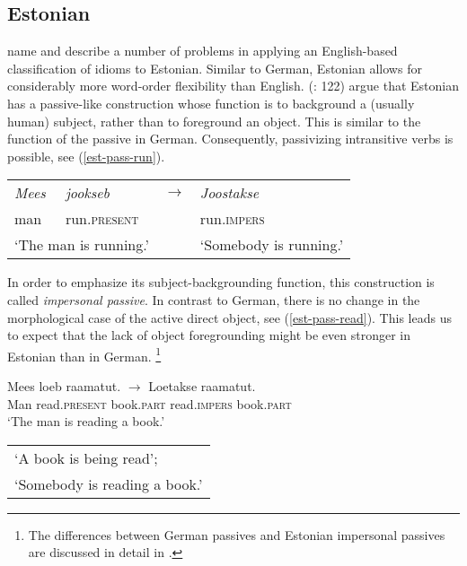 \documentclass[output=paper]{langsci/langscibook}
\begin{document}
\subsection{Estonian}

\cite{Muischnek:Kaalep:10} name and describe a number of problems in applying an English-based classification of idioms to Estonian. Similar to German, Estonian allows for considerably more word-order flexibility than English. 
\citeauthor{Muischnek:Kaalep:10} (\citeyear{Muischnek:Kaalep:10}: 122) argue that Estonian has a  passive-like construction whose function is to background a (usually human) subject, rather than to foreground an object. This is similar to the function of the passive in German. 
Consequently, passivizing intransitive verbs is possible, see (\ref{est-pass-run}).

\begin{exe}
\ex \begin{tabular}[t]{llcl}
\textit{Mees} & \textit{jookseb} & $\longrightarrow$\qquad\qquad &\textit{Joostakse}\\
man& run.\textsc{present} 	&{}&	run.\textsc{impers}\\
\multicolumn{2}{l}{`The man is running.'} & 	{}	&`Somebody is running.'
\end{tabular}
\label{est-pass-run}
\end{exe}


In order to emphasize its subject-backgrounding function, this construction is called \emph{impersonal passive}. In contrast to German, there is no change in the morpho\-logical case of the active direct object, see (\ref{est-pass-read}). This leads us to expect that the lack of object foregrounding might be even stronger in Estonian than in German.%
\footnote{The differences between German passives and Estonian impersonal passives are discussed in detail in \cite{Blevins:03}.}

\ea
\gll Mees loeb raamatut. $\longrightarrow$ {\quad} Loetakse raamatut.\\
Man read.\textsc{present} book.\textsc{part} {} {\quad} read.\textsc{impers} book.\textsc{part}\\
\glt `The man is reading a book.' {\quad}  {\quad}  {\quad}  
\begin{tabular}[t]{@{}l}
`A book is being read';\\
`Somebody is reading a book.'
\end{tabular}\label{est-pass-read}
\z
\end{document}
